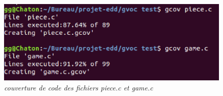 \documentclass{report}
\begin{document}
\begin{figure}
\begin{center}
\includegraphics[scale = 0.85]{gcov_terminal.eps}
\end{center}
\caption{\textit{couverture de code des fichiers piece.c et game.c}}
\label{terminal}
\end{figure}

\end{document}
